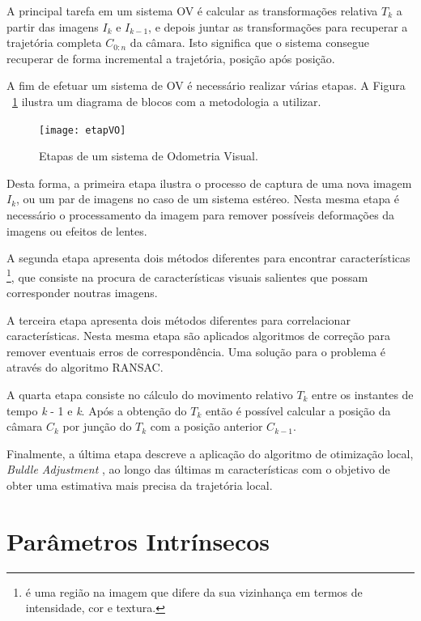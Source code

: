 A principal tarefa em um sistema OV é calcular as transformações relativa $T_k$ a partir das imagens $I_k$ e $I_{k-1}$, e depois juntar as transformações para recuperar a trajetória completa $C_{0:n}$ da câmara. Isto significa que o sistema consegue recuperar de forma incremental a trajetória, posição após posição.

A fim de efetuar um sistema de OV é necessário realizar várias etapas. A Figura ~\ref{fig:etapVO} ilustra um diagrama de blocos com a metodologia a utilizar.

\begin{figure}[h!] %
	\begin{center}
		\leavevmode		
		\texttt{[image: etapVO]}
		\caption{Etapas de um sistema de Odometria Visual.}
		\label{fig:etapVO}
	\end{center}
\end{figure}

Desta forma, a primeira etapa ilustra o processo de captura de uma nova imagem \textit{$I_k$}, ou um par de imagens no caso de um sistema estéreo. Nesta mesma etapa é necessário o processamento da imagem para remover possíveis deformações da imagens ou efeitos de lentes.

A segunda etapa apresenta dois métodos diferentes para encontrar características \footnote{é uma região na imagem que difere da sua vizinhança em termos de intensidade, cor e textura.}, que consiste na procura de características visuais salientes que possam corresponder noutras imagens.

A terceira etapa apresenta dois métodos diferentes para correlacionar características. Nesta mesma etapa são aplicados algoritmos de correção  para remover eventuais erros de correspondência. Uma solução para o problema é através do algoritmo RANSAC.

A quarta etapa consiste no cálculo do movimento relativo $T_k$ entre os instantes de tempo \textit{k} - 1 e \textit{k}. Após a obtenção do $T_k$ então é possível calcular a posição da câmara $C_k$ por junção do $T_k$ com a posição anterior $C_{k-1}$.

Finalmente, a última etapa descreve a aplicação do algoritmo de otimização local, \textit{Buldle Adjustment} , ao longo das últimas m características com o objetivo de obter uma estimativa mais precisa da trajetória local.


\section{Parâmetros Intrínsecos}

